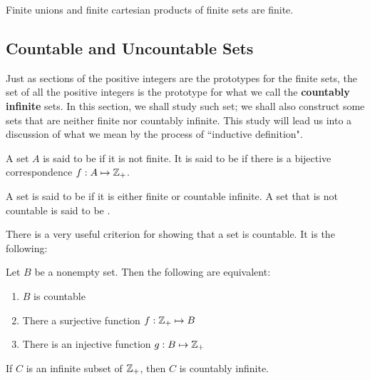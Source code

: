 \begin{corollary}
Finite unions and finite cartesian products of finite sets are finite.
\end{corollary}

\subsection{Countable and Uncountable Sets}

Just as sections of the positive integers are the prototypes for the finite sets, the set of all the positive integers is the prototype for what we call the \textbf{countably infinite} sets. In this section, we shall study such set; we shall also construct some sets that are neither finite nor countably infinite. This study will lead us into a discussion of what we mean by the process of ``inductive definition".

\begin{definition}
A set $A$ is said to be \textbf{} if it is not finite. It is said to be \textbf{} if there is a bijective correspondence $f:A \mapsto \mathbb{Z}_{+}$.
\end{definition}

\begin{definition}
A set is said to be \textbf{} if it is either finite or countable infinite. A set that is not countable is said to be \textbf{}.
\end{definition}

There is a very useful criterion for showing that a set is countable. It is the following:

\begin{theorem}
Let $B$ be a nonempty set. Then the following are equivalent:
\begin{enumerate}[itemsep=0pt]
    \item $B$ is countable
    \item There a surjective function $f:\mathbb{Z}_+ \mapsto B$
    \item There is an injective function $g: B \mapsto \mathbb{Z}_+$
\end{enumerate}
\end{theorem}

\begin{lemmad}
If $C$ is an infinite subset of $\mathbb{Z}_+$, then $C$ is countably infinite.
\end{lemmad}

